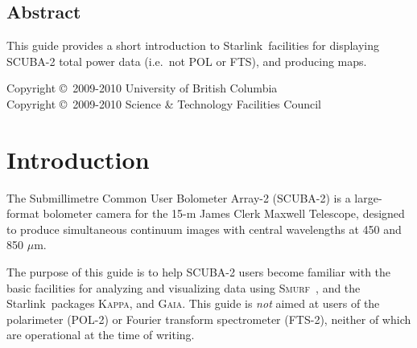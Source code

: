 \documentclass[twoside,11pt]{article}
\newcommand{\micron}{\mbox{\,${\mu}$m}}            %
\newcommand{\stardocinitials}  {SC}
\newcommand{\stardoccopyright}
{Copyright \copyright\ 2009-2010 University of British Columbia \\
 Copyright \copyright\ 2009-2010 Science \& Technology Facilities Council}
\newcommand{\stardocnumber}    {19.3}
\newcommand{\stardocabstract}  {

  This guide provides a short introduction to \starlink\ facilities
  for displaying SCUBA-2 total power data (i.e.~not POL or FTS), and
  producing maps.

}
\newcommand{\stardocname}{\stardocinitials /\stardocnumber}
\newcommand{\htmladdnormallink}[2]{#1}
\newenvironment{latexonly}{}{}
\newcommand{\xref}[3]{#1}
\newcommand{\xlabel}[1]{}
\renewcommand{\_}{\texttt{\symbol{95}}}
\newcommand{\starlink}{\htmladdnormallink{Starlink}{http://starlink.jach.hawaii.edu}}
\newcommand{\Kappa}{\xref{\textsc{Kappa}}{sun95}{}}
\newcommand{\gaia}{\xref{\textsc{Gaia}}{sun214}{}}
\newcommand{\smurf}{\xref{\textsc{Smurf}}{sun258}{}}
\renewcommand{\thepage}{\roman{page}}
\begin{document}
\begin{htmlonly}
  \section{\xlabel{abstract}Abstract}
\end{htmlonly}

\stardocabstract

\begin{latexonly}
\newpage
\vspace*{\fill}
\stardoccopyright
\end{latexonly}

  \newpage
  \begin{latexonly}
    \setlength{\parskip}{0mm}
    \tableofcontents
    \setlength{\parskip}{\medskipamount}
    \markboth{\stardocname}{\stardocname}
  \end{latexonly}

\cleardoublepage
\renewcommand{\thepage}{\arabic{page}}
\setcounter{page}{1}

\section{\xlabel{introduction}Introduction}

The Submillimetre Common User Bolometer Array-2 (SCUBA-2) is a
large-format bolometer camera for the 15-m James Clerk Maxwell
Telescope, designed to produce simultaneous continuum images with
central wavelengths at 450 and 850\,\micron.

The purpose of this guide is to help SCUBA-2 users become familiar
with the basic facilities for analyzing and visualizing data using
\smurf\ \cite{smurf}, and the \starlink\ packages \Kappa \cite{kappa},
and \gaia \cite{gaia}.  This guide is {\em not} aimed at users of the
polarimeter (POL-2) or Fourier transform spectrometer (FTS-2), neither of
which are operational at the time of writing.
\end{document}
